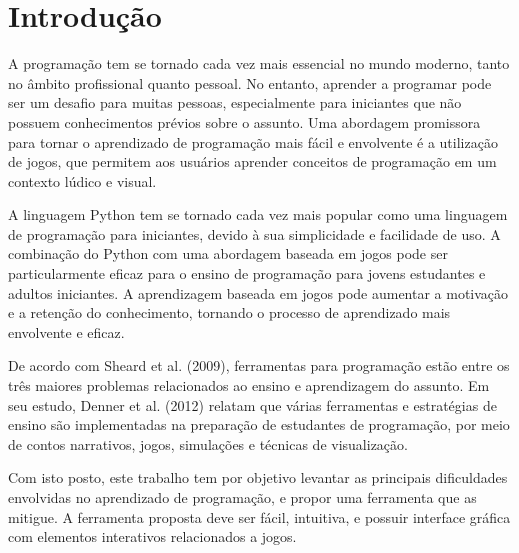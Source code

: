 \chapter[Introdução]{Introdução}

A programação tem se tornado cada vez mais essencial no mundo moderno, tanto no âmbito profissional quanto pessoal. No entanto, aprender a programar pode ser um desafio para muitas pessoas, especialmente para iniciantes que não possuem conhecimentos prévios sobre o assunto. Uma abordagem promissora para tornar o aprendizado de programação mais fácil e envolvente é a utilização de jogos, que permitem aos usuários aprender conceitos de programação em um contexto lúdico e visual.

A linguagem Python tem se tornado cada vez mais popular como uma linguagem de programação para iniciantes, devido à sua simplicidade e facilidade de uso. A combinação do Python com uma abordagem baseada em jogos pode ser particularmente eficaz para o ensino de programação para jovens estudantes e adultos iniciantes. A aprendizagem baseada em jogos pode aumentar a motivação e a retenção do conhecimento, tornando o processo de aprendizado mais envolvente e eficaz.

De acordo com Sheard et al. (2009), ferramentas para programação estão entre os três maiores problemas relacionados ao ensino e aprendizagem do assunto. Em seu estudo, Denner et al. (2012) relatam que várias ferramentas e estratégias de ensino são implementadas na preparação de estudantes de programação, por meio de contos narrativos, jogos, simulações e técnicas de visualização.

Com isto posto, este trabalho tem por objetivo levantar as principais dificuldades envolvidas no aprendizado de programação, e propor uma ferramenta que as mitigue. A ferramenta proposta deve ser fácil, intuitiva, e possuir interface gráfica com elementos interativos relacionados a jogos.